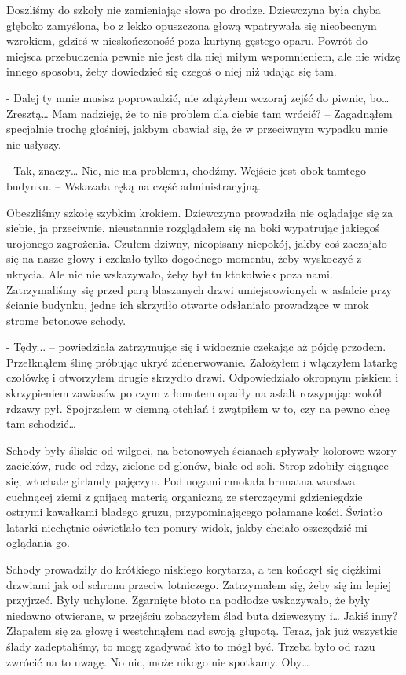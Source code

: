 \documentclass[../MAIN.tex]{subfiles}
\begin{document}
Doszliśmy do szkoły nie zamieniając słowa po drodze. Dziewczyna była chyba głęboko zamyślona, bo z lekko opuszczona głową wpatrywała się nieobecnym wzrokiem, gdzieś w nieskończoność poza kurtyną gęstego oparu. Powrót do miejsca przebudzenia pewnie nie jest dla niej miłym wspomnieniem, ale nie widzę innego sposobu, żeby dowiedzieć się czegoś o niej niż udając się tam.

- Dalej ty mnie musisz poprowadzić, nie zdążyłem wczoraj zejść do piwnic, bo… Zresztą… Mam nadzieję, że to nie problem dla ciebie tam wrócić? – Zagadnąłem specjalnie trochę głośniej, jakbym obawiał się, że w przeciwnym wypadku mnie nie usłyszy.

- Tak, znaczy… Nie, nie ma problemu, chodźmy. Wejście jest obok tamtego budynku. – Wskazała ręką na część administracyjną.

Obeszliśmy szkołę szybkim krokiem. Dziewczyna prowadziła nie oglądając się za siebie, ja przeciwnie, nieustannie rozglądałem się na boki wypatrując jakiegoś urojonego zagrożenia. Czułem dziwny, nieopisany niepokój, jakby coś zaczajało się na nasze głowy i czekało tylko dogodnego momentu, żeby wyskoczyć z ukrycia. Ale nic nie wskazywało, żeby był tu ktokolwiek poza nami. Zatrzymaliśmy się przed parą blaszanych drzwi umiejscowionych w asfalcie przy ścianie budynku, jedne ich skrzydło otwarte odsłaniało prowadzące w mrok strome betonowe schody.

- Tędy... – powiedziała zatrzymując się i widocznie czekając aż pójdę przodem. Przełknąłem ślinę próbując ukryć zdenerwowanie. Założyłem i włączyłem latarkę czołówkę i otworzyłem drugie skrzydło drzwi. Odpowiedziało okropnym piskiem i skrzypieniem zawiasów po czym z łomotem opadły na asfalt rozsypując wokół rdzawy pył. Spojrzałem w ciemną otchłań i zwątpiłem w to, czy na pewno chcę tam schodzić…

Schody były śliskie od wilgoci, na betonowych ścianach spływały kolorowe wzory zacieków, rude od rdzy, zielone od glonów, białe od soli. Strop zdobiły ciągnące się, włochate girlandy pajęczyn. Pod nogami cmokała brunatna warstwa cuchnącej ziemi z gnijącą materią organiczną ze sterczącymi gdzieniegdzie ostrymi kawałkami bladego gruzu, przypominającego połamane kości. Światło latarki niechętnie oświetlało ten ponury widok, jakby chciało oszczędzić mi oglądania go. 

Schody prowadziły do krótkiego niskiego korytarza, a ten kończył się ciężkimi drzwiami jak od schronu przeciw lotniczego. Zatrzymałem się, żeby się im lepiej przyjrzeć. Były uchylone. Zgarnięte błoto na podłodze wskazywało, że były niedawno otwierane, w przejściu zobaczyłem ślad buta dziewczyny i… Jakiś inny? Złapałem się za głowę i westchnąłem nad swoją głupotą. Teraz, jak już wszystkie ślady zadeptaliśmy, to mogę zgadywać kto to mógł być. Trzeba było od razu zwrócić na to uwagę. No nic, może nikogo nie spotkamy. Oby…
\end{document}
